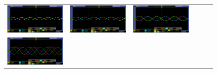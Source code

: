 \documentclass{article}
\newenvironment{standalone}{\begin{preview}}{\end{preview}}
\begin{document}
\begin{standalone}
\begin{figure}[!htbp]
    \begin{tabular}{lccccc}
      \includegraphics[width=\linewidth/3]{../images/pasada-osciloscopio/pasada1.png}&
      \includegraphics[width=\linewidth/3]{../images/pasada-osciloscopio/pasada2.png}&
      \includegraphics[width=\linewidth/3]{../images/pasada-osciloscopio/pasada3.png}\\
      \includegraphics[width=\linewidth/3]{../images/pasada-osciloscopio/pasada4.png}&

\end{tabular}
\end{figure}
\end{standalone}
\end{document}

